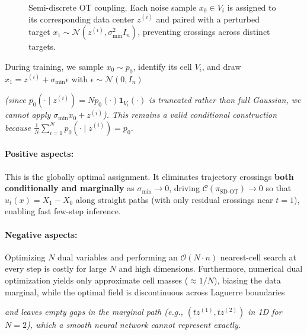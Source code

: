 \begin{figure}[t]
\begin{minipage}[b]{0.55\textwidth}
{%
        }
        \caption{Semi-discrete OT coupling. Each noise sample $x_0 \in V_i$ is assigned to its corresponding data center $z^{(i)}$ and paired with a perturbed target $x_1 \sim \mathcal{N}(z^{(i)}, \sigma_{\min}^2 I_n)$, preventing crossings across distinct targets.}
        \label{fig:semidiscrete_coupling}
    \end{minipage}
\end{figure}

During training, we sample $x_0 \sim p_0$, identify its cell $V_i$, and draw $x_1 = z^{(i)} + \sigma_{\min}\epsilon$ with $\epsilon \sim \mathcal{N}(0, I_n)$ 


\textit{(since $p_0(\cdot \mid z^{(i)}) = N p_0(\cdot)\mathbf{1}_{V_i}(\cdot)$ is truncated rather than full Gaussian, we cannot apply $\sigma_{\min}x_0 + z^{(i)}$). This remains a valid conditional construction because $\frac{1}{N}\sum_{i=1}^N p_0(\cdot \mid z^{(i)}) = p_0$.}

\paragraph{Positive aspects:} This is the globally optimal assignment. It eliminates trajectory crossings \textbf{both conditionally and marginally} as $\sigma_{\min} \to 0$, driving $\mathcal{C}(\pi_{\text{SD-OT}}) \to 0$ so that $u_t(x) = X_1 - X_0$ along straight paths (with only residual crossings near $t=1$), enabling fast few-step inference.

\paragraph{Negative aspects:} Optimizing $N$ dual variables and performing an $\mathcal{O}(N \cdot n)$ nearest-cell search at every step is costly for large $N$ and high dimensions. Furthermore, numerical dual optimization yields only approximate cell masses ($\approx 1/N$), biasing the data marginal, while the optimal field is discontinuous across Laguerre boundaries 

\textit{and leaves empty gaps in the marginal path (e.g., $(tz^{(1)}, tz^{(2)})$ in 1D for $N=2$), which a smooth neural network cannot represent exactly.}

